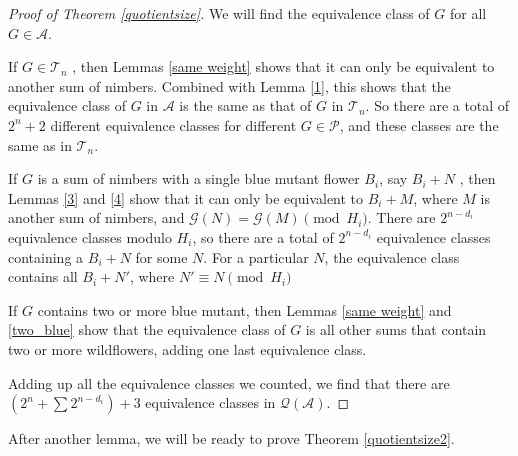 \documentclass{amsart}
\theoremstyle{plain}
\theoremstyle{definition}
\theoremstyle{remark}
\numberwithin{equation}{section}
\numberwithin{thm}{section}
\begin{document}
\begin{proof}[Proof of Theorem \ref{quotientsize}]
We will find the equivalence class of $G$ for all $G \in \mathscr{A}$.

    If $G \in \mathscr{T}_n$ , then Lemmas \ref{same weight} shows that it can only be equivalent to another sum of nimbers. Combined with Lemma \ref{1}, this shows that the equivalence class of $G$ in $\mathscr{A}$ is the same as that of $G$ in $\mathscr{T}_n$. So there are a total of $2^n +2$ different equivalence classes for different $G \in \mathscr{P}$, and these classes are the same as in $\mathscr{T}_n$.

    If $G$ is a sum of nimbers with a single blue mutant flower $B_i$, say $B_i +N$ , then Lemmas \ref{3} and \ref{4} show that it can only be equivalent to $B_i+M$, where $M$ is another sum of nimbers, and $\mathcal{G}(N) = \mathcal{G}(M) \pmod {H_i} $. There are $2^{n-d_i}$ equivalence classes modulo $H_i$, so there are a total of $2^{n-d_i}$ equivalence classes containing a $B_i +N$ for some $N$. For a particular $N$, the equivalence class contains all $B_i + N'$, where $N' \equiv N \pmod {H_i}$

    If $G$ contains two or more blue mutant, then Lemmas \ref{same weight} and \ref{two_blue} show that the equivalence class of $G$ is all other sums that contain two or more wildflowers, adding one last equivalence class. 

    Adding up all the equivalence classes we counted, we find that there are $\left( 2^n + \sum 2^{n-d_i} \right) + 3$ equivalence classes in $\mathcal{Q}(\mathscr{A})$.
\end{proof}
After another lemma, we will be ready to prove Theorem \ref{quotientsize2}.
\end{document}
